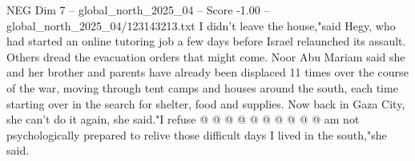 \begin{textsample}{NEG Dim 7 – global\_north\_2025\_04 – Score -1.00 – global\_north\_2025\_04/123143213.txt}
I didn't leave the house,"said Hegy, who had started an online tutoring job a few days before Israel relaunched its assault.
Others dread the evacuation orders that might come.
Noor Abu Mariam said she and her brother and parents have already been displaced 11 times over the course of the war, moving through tent camps and houses around the south, each time starting over in the search for shelter, food and supplies.
Now back in Gaza City, she can't do it again, she said."I refuse @ @ @ @ @ @ @ @ @ @ am not psychologically prepared to relive those difficult days I lived in the south,"she said.

\end{textsample}
